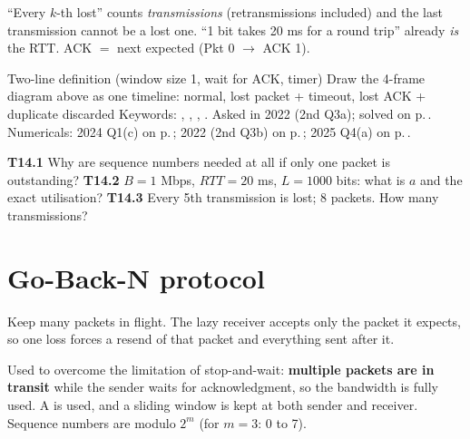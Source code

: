\begin{warningbox}
``Every $k$-th lost'' counts \emph{transmissions} (retransmissions included) and the last transmission cannot be a lost one. ``1 bit takes 20 ms for a round trip'' already \emph{is} the RTT. ACK $=$ next expected (Pkt 0 $\to$ ACK 1).
\end{warningbox}

\begin{answerplan}
 Two-line definition (window size 1, wait for ACK, timer) \quad {} Draw the 4-frame diagram above as one timeline: normal, lost packet + timeout, lost ACK + duplicate discarded \quad
{} Keywords: , , , . Asked in 2022 (2nd Q3a); solved on p.\,\pageref{q:MS2022-3Ba}.
Numericals: 2024 Q1(c) on p.\,\pageref{q:MS2024-1c}; 2022 (2nd Q3b) on p.\,\pageref{q:MS2022-3Bb}; 2025 Q4(a) on p.\,\pageref{q:MS2025-4a}.
\par{} \textbf{T14.1} Why are sequence numbers needed at all if only one packet is outstanding?\quad
\textbf{T14.2} $B=1$ Mbps, $RTT=20$ ms, $L=1000$ bits: what is $a$ and the exact utilisation?\quad
\textbf{T14.3} Every 5th transmission is lost; 8 packets. How many transmissions?
\end{answerplan}

\section{Go-Back-N protocol}\label{sec:T15}
  

\begin{intuitionbox}
Keep many packets in flight. The lazy receiver accepts only the packet it expects, so one loss forces a resend of that packet and everything sent after it.
\end{intuitionbox}

\begin{definitionbox}
Used to overcome the limitation of stop-and-wait: \textbf{multiple packets are in transit} while the sender waits for acknowledgment,
so the bandwidth is fully used. A  is used, and a sliding window is kept at both sender and receiver.
Sequence numbers are modulo $2^m$ (for $m=3$: 0 to 7). 
\end{definitionbox}

